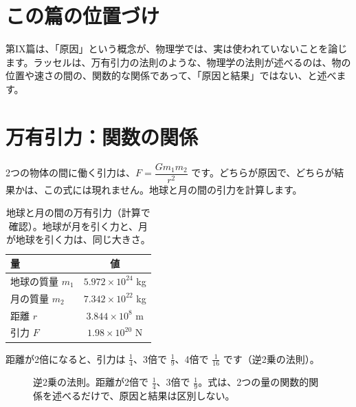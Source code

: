 \documentclass[a4paper,11pt,openany]{ltjsbook}
\begin{document}
\section{この篇の位置づけ}

第IX篇は、「原因」という概念が、物理学では、実は使われていないことを論じます。ラッセルは、万有引力の法則のような、物理学の法則が述べるのは、物の位置や速さの間の、関数的な関係であって、「原因と結果」ではない、と述べます。

\section{万有引力：関数の関係}

2つの物体の間に働く引力は、$F=\dfrac{Gm_1m_2}{r^2}$ です。どちらが原因で、どちらが結果かは、この式には現れません。地球と月の間の引力を計算します。

\begin{table}[htbp]
\centering
\begin{tabular}{lc}
\toprule
量 & 値\\
\midrule
地球の質量 $m_1$ & $5.972\times10^{24}$ kg\\
月の質量 $m_2$ & $7.342\times10^{22}$ kg\\
距離 $r$ & $3.844\times10^{8}$ m\\
引力 $F$ & $1.98\times10^{20}$ N\\
\bottomrule
\end{tabular}
\caption{地球と月の間の万有引力（計算で確認）。地球が月を引く力と、月が地球を引く力は、同じ大きさ。}
\end{table}

距離が2倍になると、引力は $\tfrac14$、3倍で $\tfrac19$、4倍で $\tfrac1{16}$ です（逆2乗の法則）。

\begin{figure}[htbp]
\centering
{}
\caption{逆2乗の法則。距離が2倍で $\tfrac14$、3倍で $\tfrac19$。式は、2つの量の関数的関係を述べるだけで、原因と結果は区別しない。}
\end{figure}
\end{document}
